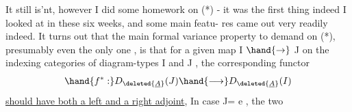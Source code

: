 It still is'nt, however I did some homework on (*) - it was the
first thing indeed I looked at in these six weeks, and some main featu-%
res came out very readily indeed. It turns out that the main formal
variance property to demand on (*), presumably even the only one , is
that for a given map  I $\hand{\to}$ J on the indexing categories of diagram-types
I and J , the corresponding functor
\[ \hand{f^*:} D_{\deleted{\underline{A}}}(J) \hand{\longrightarrow} D_{\deleted{\underline{A}}}(I) \]
\uline{should have both a left and a right adjoint},  In case J= e , the two
